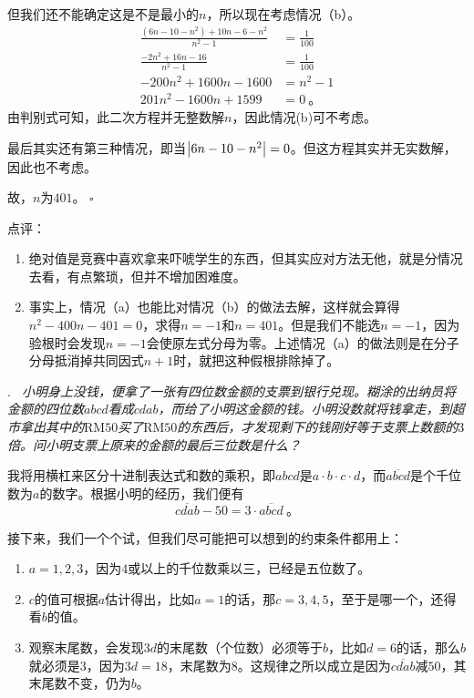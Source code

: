\documentclass[a4,12pt]{article}
\newcounter{Problem}
\newcommand{\Problem}[1]{
		\vspace*{10pt}
		\stepcounter{Problem}
		\label{Problem \arabic{Problem}}
		\noindent\arabic{Problem}.\emph{~#1}
	}
\newcommand{\Qed}{\hfill\ensuremath{\square}}
\begin{document}
	但我们还不能确定这是不是最小的$n$，所以现在考虑情况（b）。
	\[ \begin{aligned}
			\frac{(6n-10-n^2) + 10n-6-n^2}{n^2-1} &= \frac{1}{100} \\
			\frac{-2n^2 + 16n - 16}{n^2-1} &= \frac{1}{100} \\
			-200n^2 + 1600n - 1600 &= n^2 -1 \\
			201n^2 - 1600n + 1599 &= 0 \ \mbox{。}
		\end{aligned}
	\]
	由判别式可知，此二次方程并无整数解$n$，因此情况(b)可不考虑。

	最后其实还有第三种情况，即当$\abs{6n-10-n^2}=0$。但这方程其实并无实数解，因此也不考虑。

	故，$n$为$401$。
	\Qed
	\vspace*{30pt}

	\noindent 点评：
	\begin{enumerate}[label=(\alph*)]
		\item 绝对值是竞赛中喜欢拿来吓唬学生的东西，但其实应对方法无他，就是分情况去看，有点繁琐，但并不增加困难度。
		\item 事实上，情况（a）也能比对情况（b）的做法去解，这样就会算得$n^2-400n-401=0$，求得$n=-1$和$n=401$。但是我们不能选$n=-1$，因为验根时会发现$n=-1$会使原左式分母为零。上述情况（a）的做法则是在分子分母抵消掉共同因式$n+1$时，就把这种假根排除掉了。
	\end{enumerate}

\pagebreak
\Problem{
	小明身上没钱，便拿了一张有四位数金额的支票到银行兑现。糊涂的出纳员将金额的四位数$abcd$看成$cdab$，而给了小明这金额的钱。小明没数就将钱拿走，到超市拿出其中的$\mathrm{RM}50$买了$\mathrm{RM}50$的东西后，才发现剩下的钱刚好等于支票上数额的$3$倍。问小明支票上原来的金额的最后三位数是什么？
	}

	我将用横杠来区分十进制表达式和数的乘积，即$abcd$是$a\cdot b\cdot c\cdot d$，而$\overline{abcd}$是个千位数为$a$的数字。根据小明的经历，我们便有
	\[ \overline{cdab} - 50 = 3\cdot\overline{abcd} \ \mbox{。} \]

	接下来，我们一个个试，但我们尽可能把可以想到的约束条件都用上：
	\begin{enumerate}[label=(\alph*)]
		\item $a=1,2,3$，因为$4$或以上的千位数乘以三，已经是五位数了。
		\item $c$的值可根据$a$估计得出，比如$a=1$的话，那$c=3, 4, 5$，至于是哪一个，还得看$b$的值。
		\item 观察末尾数，会发现$3d$的末尾数（个位数）必须等于$b$，比如$d=6$的话，那么$b$就必须是$3$，因为$3d=18$，末尾数为$8$。这规律之所以成立是因为$\overline{cdab}$减$50$，其末尾数不变，仍为$b$。
	\end{enumerate}
\end{document}
